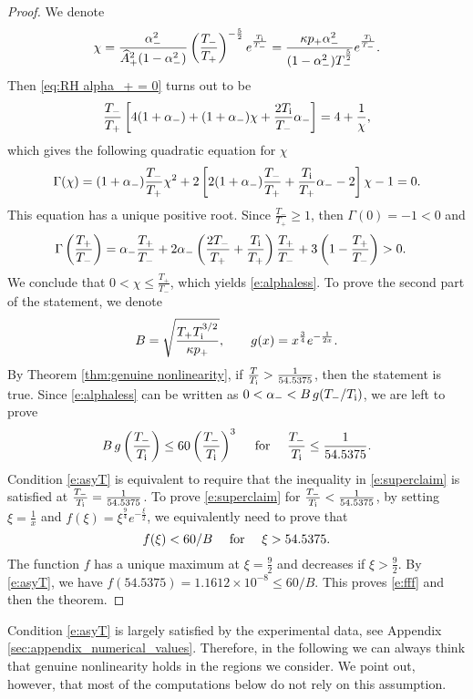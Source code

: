\documentclass[10pt,a4paper]{article}
\numberwithin{equation}{section}
\begin{document}
\begin{proof}
We denote 
$$
\chi = \frac{\alpha_-^2}{\widehat{A}_+^2(1 - \alpha_-^2)} \left(\frac{T_{-}}{T_{+}}\right)^{-\frac{5}{2}}
e^{\frac{T_{\rm i}}{T_{-}}} = \frac{\kappa p_+\alpha_-^2}{(1 - \alpha_-^2)T_{-}^{\frac{5}{2}}}
e^{\frac{T_{\rm i}}{T_{-}}}.
$$
Then \eqref{eq:RH alpha_+ = 0} turns out to be
$$
\frac{T_{-}}{T_{+}}\left[4(1 + \alpha_-) + (1 + \alpha_-)\chi + \frac{2T_{\rm i}}{T_{-}}\alpha_-\right]
=
4 + \frac{1}{\chi},
$$
which gives the following quadratic equation for $\chi$
\begin{equation}\label{e:Gamma}
  \Gamma(\chi) = (1 + \alpha_-)\frac{T_-}{T_+}\chi^2 + 2 \left[2(1 + \alpha_-)\frac{T_-}{T_+} + \frac{T_{\rm i}}{T_+}\alpha_- - 2\right]\chi - 1 = 0.
\end{equation}
This equation has a unique positive root. Since $\frac{T_-}{T_+} \geq 1$, then $\Gamma(0) = -1 < 0$ and 
\begin{align*}
   \Gamma\left(\frac{T_+}{T_-}\right)
&= \alpha_-\frac{T_+}{T_-} + 2 \alpha_-\left(\frac{2T_-}{T_+} + \frac{T_{\rm i}}{T_+}\right)\frac{T_+}{T_-} + 3\left(1 - \frac{T_+}{T_-}\right)> 0.
\end{align*}
We conclude that $0 < \chi \leq \frac{T_+}{T_-}$, which yields \eqref{e:alphaless}. To prove the second part of the statement, we denote
\[
B = \sqrt{\frac{T_{+}T_{\rm i}^{3/2}}{\kappa p_{+} }}, \qquad g(x) = x^\frac34 e^{-\frac{1}{2x}}.
\]
By Theorem \ref{thm:genuine nonlinearity}, if $\frac{T}{T_{\rm i}} > \frac{1}{54.5375}$, then the statement is true. Since \eqref{e:alphaless} can be written as $0 < \alpha_- < B\, g(T_-/T_{\rm i})$,  we are left to prove 
\begin{equation}\label{e:superclaim}
B\, g\left(\frac{T_-}{T_{\rm i}}\right) \le 60 \left(\frac{T_-}{T_{\rm i}}\right)^3\quad  \hbox{ for } \quad\frac{T_-}{T_{\rm i}}\le \frac{1}{54.5375}.
\end{equation}
Condition \eqref{e:asyT} is equivalent to require that the inequality in \eqref{e:superclaim} is satisfied at $\frac{T_-}{T_{\rm i}} = \frac{1}{54.5375}$.
To prove \eqref{e:superclaim} for $\frac{T_-}{T_{\rm i}} < \frac{1}{54.5375}$, by setting $\xi = \frac{1}{x}$ and $f(\xi) = \xi^{\frac{9}{4}}e^{-\frac{\xi}{2}}$, we equivalently need to prove that 
\begin{equation}\label{e:fff}
   f(\xi) < 60/B\quad \hbox{ for }\quad \xi > 54.5375. 
\end{equation}
The function $f$ has a unique maximum at $\xi = \frac{9}{2}$ and decreases if $\xi > \frac{9}{2}$.
By \eqref{e:asyT}, we have $f(54.5375)= 1.1612 \times 10^{-8}\le 60/B$.
This proves \eqref{e:fff} and then the theorem. 
\end{proof}
%
Condition \eqref{e:asyT} is largely satisfied by the experimental data, see Appendix \ref{sec:appendix_numerical_values}. Therefore, in the following we can always think that genuine nonlinearity holds in the regions we consider. We point out, however, that most of the computations below do not rely on this assumption.
\end{document}
